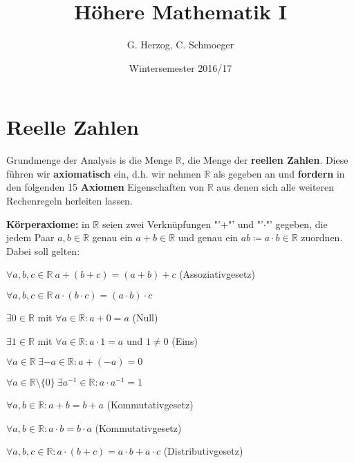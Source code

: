 \documentclass[titlepage,ngerman,a4paper,headsepline]{scrartcl}
\title{Höhere Mathematik I}
\author{G. Herzog, C. Schmoeger}
\date{Wintersemester 2016/17}
\newcommand{\R}{\mathbb{R}}
\theoremstyle{named}
\theoremstyle{dotless}
\begin{document}
\maketitle
	
\tableofcontents
 \thispagestyle{empty}
 \newpage 
  
\section{Reelle Zahlen}

Grundmenge der Analysis is die Menge $\R$, die Menge der \textbf{reellen Zahlen}. Diese führen wir \textbf{axiomatisch} ein, d.h. wir nehmen $\R$ als gegeben an und \textbf{fordern} in den folgenden 15 \textbf{Axiomen} Eigenschaften von $\R$ aus denen sich alle weiteren Rechenregeln herleiten lassen.  


\textbf{Körperaxiome:} in $\R$ seien zwei Verknüpfungen "'$+$"' und "'$\cdot$"' gegeben, die jedem Paar $a, b \in \R$ genau ein $a + b \in \R$ und genau ein $a b \coloneqq a \cdot b \in \R$ zuordnen. Dabei soll gelten:


\begin{description} \addtolength{\itemindent}{0.4cm} \label{k.axiom}
	\item[$(A1)$] $\forall a, b, c \in \R \: a + \left( b + c \right) = \left( a + b \right) + c$  (Assoziativgesetz) \label{k.axiom-a1}
	\item[$(A5)$] $\forall a, b, c \in \R \: a \cdot \left( b \cdot c \right) = \left( a \cdot b \right) \cdot c$ \label{k.axiom-a5}
	\item[$(A2)$] $\exists 0 \in \R$ mit $\forall a \in \R : a + 0 = a$ (Null) \label{k.axiom-a2}
	\item[$(A6)$] $\exists 1 \in \R$ mit $\forall a \in \R : a \cdot 1 = a$ und $1 \neq 0$ (Eins) \label{k.axiom-a6}
	\item[$(A3)$] $\forall a \in \R ~ \exists -a \in \R : a + (-a) = 0$ \label{k.axiom-a3}
	\item[$(A7)$] $\forall a \in \R \setminus \{ 0 \} ~ \exists a^{-1} \in \R : a \cdot a^{-1} = 1$ \label{k.axiom-a7}
	\item[$(A4)$] $\forall a, b \in \R : a + b = b + a$ (Kommutativgesetz) \label{k.axiom-a4}
	\item[$(A8)$] $\forall a, b \in \R : a \cdot b = b \cdot a$ \label{k.axiom-a8}(Kommutativgesetz)
	\item[$(A9)$] $\forall a, b, c \in \R : a \cdot (b + c) = a \cdot b + a \cdot c$ (Distributivgesetz) \label{k.axiom-a9}
\end{description}
\end{document}
